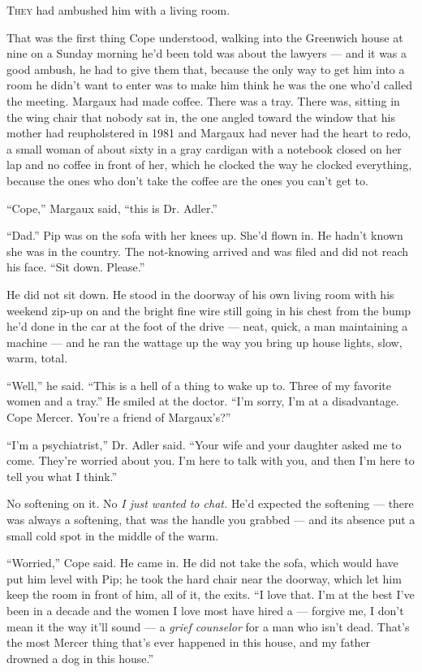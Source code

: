 \documentclass[11pt,openany]{book}
\begin{document}
\lettrine[lines=3, lhang=0.05, nindent=0.25em]{T}{hey} had ambushed him with a living room.

That was the first thing Cope understood, walking into the Greenwich house at nine on a Sunday morning he'd been told was about the lawyers --- and it was a good ambush, he had to give them that, because the only way to get him into a room he didn't want to enter was to make him think he was the one who'd called the meeting. Margaux had made coffee. There was a tray. There was, sitting in the wing chair that nobody sat in, the one angled toward the window that his mother had reupholstered in 1981 and Margaux had never had the heart to redo, a small woman of about sixty in a gray cardigan with a notebook closed on her lap and no coffee in front of her, which he clocked the way he clocked everything, because the ones who don't take the coffee are the ones you can't get to.

``Cope,'' Margaux said, ``this is Dr. Adler.''

``Dad.'' Pip was on the sofa with her knees up. She'd flown in. He hadn't known she was in the country. The not-knowing arrived and was filed and did not reach his face. ``Sit down. Please.''

He did not sit down. He stood in the doorway of his own living room with his weekend zip-up on and the bright fine wire still going in his chest from the bump he'd done in the car at the foot of the drive --- neat, quick, a man maintaining a machine --- and he ran the wattage up the way you bring up house lights, slow, warm, total.

``Well,'' he said. ``This is a hell of a thing to wake up to. Three of my favorite women and a tray.'' He smiled at the doctor. ``I'm sorry, I'm at a disadvantage. Cope Mercer. You're a friend of Margaux's?''

``I'm a psychiatrist,'' Dr. Adler said. ``Your wife and your daughter asked me to come. They're worried about you. I'm here to talk with you, and then I'm here to tell you what I think.''

No softening on it. No \textit{I just wanted to chat.} He'd expected the softening --- there was always a softening, that was the handle you grabbed --- and its absence put a small cold spot in the middle of the warm.

``Worried,'' Cope said. He came in. He did not take the sofa, which would have put him level with Pip; he took the hard chair near the doorway, which let him keep the room in front of him, all of it, the exits. ``I love that. I'm at the best I've been in a decade and the women I love most have hired a --- forgive me, I don't mean it the way it'll sound --- a \textit{grief counselor} for a man who isn't dead. That's the most Mercer thing that's ever happened in this house, and my father drowned a dog in this house.''
\end{document}
